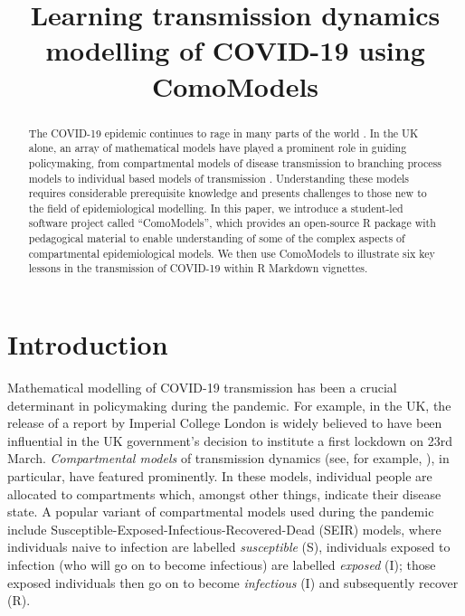 \documentclass[]{article}
\title{Learning transmission dynamics modelling of COVID-19 using ComoModels}
\begin{document}
	\maketitle

\begin{abstract}
The COVID-19 epidemic continues to rage in many parts of the world \citep{dong2020interactive}. In the UK alone, an array of mathematical models have played a prominent role in guiding policymaking, from compartmental models of disease transmission \citep{birrell2021real,danon2020spatial} to branching process models \citep{davies2020effects} to individual based models of transmission \citep{ferguson2020report}. Understanding these models requires considerable prerequisite knowledge and presents challenges to those new to the field of epidemiological modelling. In this paper, we introduce a student-led software project called ``ComoModels'', which provides an open-source R package with pedagogical material to enable understanding of some of the complex aspects of compartmental epidemiological models. We then use ComoModels to illustrate six key lessons in the transmission of COVID-19 within R Markdown vignettes.
\end{abstract}

\section{Introduction}
Mathematical modelling of COVID-19 transmission has been a crucial determinant in policymaking during the pandemic. For example, in the UK, the release of a report by Imperial College London \citep{ferguson2020report} is widely believed to have been influential in the UK government's decision to institute a first lockdown on 23rd March. \textit{Compartmental models} of transmission dynamics (see, for example, \cite{anderson1992infectious,brauer2008compartmental}), in particular, have featured prominently. In these models, individual people are allocated to compartments which, amongst other things, indicate their disease state. A popular variant of compartmental models used during the pandemic include Susceptible-Exposed-Infectious-Recovered-Dead (SEIR) models, where individuals naive to infection are labelled \textit{susceptible} (S), individuals exposed to infection (who will go on to become infectious) are labelled \textit{exposed} (I); those exposed individuals then go on to become \textit{infectious} (I) and subsequently recover (R).
\end{document}
